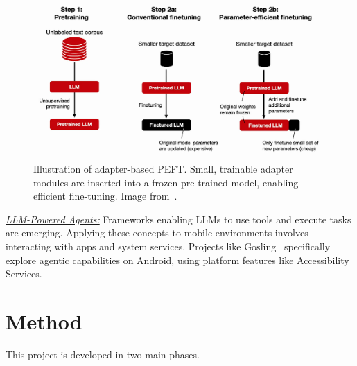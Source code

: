 \documentclass[conference]{IEEEtran}
\begin{document}
\begin{figure}[t]
\centering
\includegraphics[width=0.9\linewidth]{images/adapters.png}
\caption{Illustration of adapter-based PEFT. Small, trainable adapter modules are inserted into a frozen pre-trained model, enabling efficient fine-tuning. Image from~\cite{adaptersimage}.}
\label{fig:adapters}
\end{figure}

\textit{\uline{LLM-Powered Agents:}} Frameworks enabling LLMs to use tools and execute tasks are emerging. Applying these concepts to mobile environments involves interacting with apps and system services. Projects like Gosling~\cite{gosling} specifically explore agentic capabilities on Android, using platform features like Accessibility Services.

\section{Method}
This project is developed in two main phases.
\end{document}
